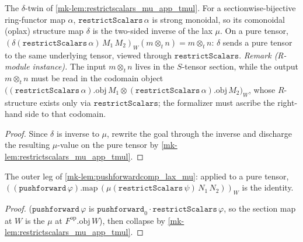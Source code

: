 \begin{lemma}\label{mk-lem:restrictscalars_delta_app_tmul}
  \leanok

  The \(\delta\)-twin of \ref{mk-lem:restrictscalars_mu_app_tmul}. For a sectionwise-bijective
  ring-functor map \(\alpha\), \(\mathtt{restrictScalars}\,\alpha\) is strong monoidal, so its
  comonoidal (oplax) structure map \(\delta\) is the two-sided inverse of the lax \(\mu\). On a pure
  tensor, \((\delta(\mathtt{restrictScalars}\,\alpha)\,M_1\,M_2)_W(m \otimes_t n) = m \otimes_t n\):
  \(\delta\) sends a pure tensor to the same underlying tensor, viewed through
  \(\mathtt{restrictScalars}\). \emph{Remark (R-module instance).} The input \(m \otimes_t n\) lives
  in the \(S\)-tensor section, while the output \(m \otimes_t n\) must be read in the codomain object
  \(\bigl((\mathtt{restrictScalars}\,\alpha).\mathrm{obj}\,M_1 \otimes
  (\mathtt{restrictScalars}\,\alpha).\mathrm{obj}\,M_2\bigr)_W\), whose \(R\)-structure exists only
  via \(\mathtt{restrictScalars}\); the formalizer must ascribe the right-hand side to that codomain.
\end{lemma}
\begin{proof}
  \leanok
  Since \(\delta\) is inverse to \(\mu\), rewrite the goal through the inverse and discharge the resulting
  \(\mu\)-value on the pure tensor by
  \ref{mk-lem:restrictscalars_mu_app_tmul}.
\end{proof}

\begin{lemma}\label{mk-lem:pushforward_map_restrictscalars_mu_app_tmul}
  \leanok

  The outer leg of \ref{mk-lem:pushforwardcomp_lax_mu}: applied to a pure tensor,
  \(((\mathtt{pushforward}\,\varphi).\mathrm{map}\,(\mu(\mathtt{restrictScalars}\,\psi)
  \,N_1\,N_2))_W\) is the identity.
\end{lemma}
\begin{proof}
  \leanok
  (\(\mathtt{pushforward}\,\varphi\) is \(\mathtt{pushforward}_0 \cdot \mathtt{restrictScalars}\,\varphi\),
  so the section map at \(W\) is the \(\mu\) at \(F^{\mathrm{op}}.\mathrm{obj}\,W\)), then collapse
  by \ref{mk-lem:restrictscalars_mu_app_tmul}.
\end{proof}


